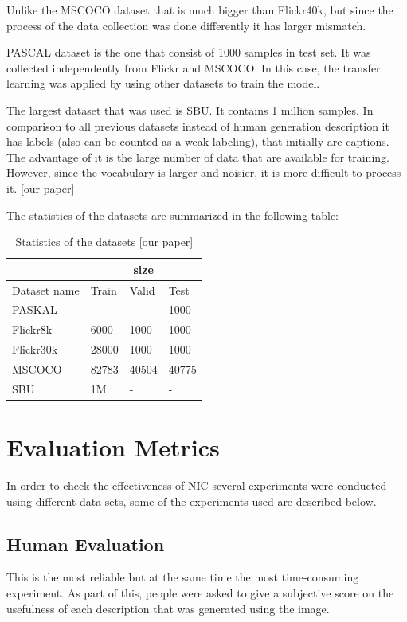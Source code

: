 \documentclass[a4paper,UKenglish,cleveref, autoref, thm-restate]{lipics-v2021}
\begin{document}
Unlike the MSCOCO dataset that is much bigger than Flickr40k, but since the process of the data collection was done differently it has larger mismatch.

PASCAL dataset is the one that consist of 1000 samples in test set. It was collected independently from Flickr and MSCOCO. In this case, the transfer learning was applied by using other datasets to train the model.

The largest dataset that was used is SBU. It contains 1 million samples. In comparison to all previous datasets instead of human generation description it has labels (also can be counted as a weak labeling), that initially are captions. The advantage of it is the large number of data that are available for training. However, since the vocabulary is larger and noisier, it is more difficult to process it. [our paper]

The statistics of the datasets are summarized in the following table:
\begin{table}
\centering
\begin{tabular}{ |p{3cm}||p{2cm}|p{2cm}|p{2cm}|  }
    \hline
    \centering
     & \multicolumn{3}{|c|}{size}\\
    \hline
     Dataset name & Train & Valid & Test \\
    \hline
     PASKAL   & - & - & 1000\\
     Flickr8k &  6000  & 1000 & 1000\\
     Flickr30k & 28000 & 1000 & 1000\\
     MSCOCO    & 82783 & 40504 & 40775\\
     SBU &   1M  & - & - \\
     \hline
\end{tabular}
\caption{Statistics of the datasets [our paper]}
\end {table}

\section{Evaluation Metrics}
In order to check the effectiveness of NIC several experiments were conducted using different data sets, some of the experiments used are described below.

\label{Evaluation metrics}
\subsection{Human Evaluation}
This is the most reliable but at the same time the most time-consuming experiment. As part of this, people were asked to give a subjective score on the usefulness of each description that was generated using the image.
\end{document}
